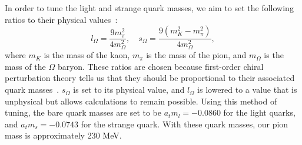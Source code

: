 In order to tune the light and strange quark masses, we aim to set the following ratios to their physical values~\cite{Lin:2008pr}:
\begin{equation}
        l_{\Omega}=\frac{9 m_{\pi}^{2}}{4 m_{\Omega}^{2}},\quad
        s_{\Omega}=\frac{9\left(m_{K}^{2}-m_{\pi}^{2}\right)}{4 m_{\Omega}^{2}},
\end{equation}
where $m_K$ is the mass of the kaon, $m_\pi$ is the mass of the pion, and $m_\Omega$ is the mass of the $\Omega$ baryon. These ratios are chosen because first-order chiral perturbation theory tells us that they should be proportional to their associated quark masses~\cite{Lin:2008pr}. $s_\Omega$ is set to its physical value, and $l_\Omega$ is lowered to a value 
that is unphysical but allows calculations to remain possible. Using this method of tuning, the bare quark masses are set to be $a_t m_l = -0.0860$ for the light quarks, 
and $a_t m_s = -0.0743$ for the strange quark. With these quark masses, our pion mass is 
approximately 230 MeV.

